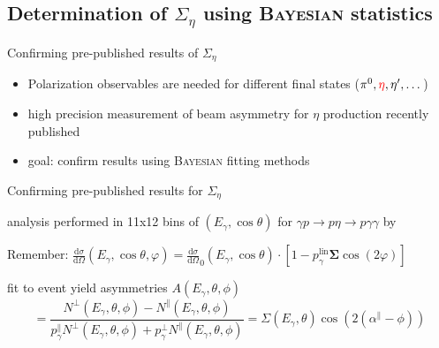 \documentclass[11pt,aspectratio=169,dvipsnames]{beamer}
\newcommand{\thecolor}{black!70!blue}
\begin{document}
	\subsection{Determination of $\Sigma_\eta$ using \textsc{Bayesian} statistics}
		\begin{frame}{Confirming pre-published results of $\Sigma_\eta$}
		\begin{itemize}
			\item Polarization observables are needed for different final states ($\pi^0,{\color{red}\eta},\eta',\dots$)
			\item high precision measurement of beam asymmetry for $\eta$ production recently published {\cites{eta}}
			\item goal: confirm results using \textsc{Bayesian} fitting methods
		\end{itemize}
		
	\end{frame}
	\begin{frame}{Confirming pre-published results for $\Sigma_\eta$}
		
		\begin{minipage}{\linewidth}
			\begin{tcolorbox}[colback=blue!5,colframe=\thecolor,title={Event selection ($\eta$)}]
				analysis performed in 11x12 bins of $(E_\gamma,\cos\theta)$ for $\gamma p\to p\eta\to p\gamma\gamma$ by {\cites{eta}}
			\end{tcolorbox}
		\end{minipage}
		\begin{minipage}{\linewidth}
			\begin{tcolorbox}[colback=blue!5,colframe=\thecolor,title={Methods}]
				\begin{center}
					Remember: $\frac{\text{d}\sigma}{\text{d}\Omega}(E_\gamma,\cos\theta,\varphi)=\frac{\text{d}\sigma}{\text{d}\Omega}_0(E_\gamma,\cos\theta)\cdot\left[1-p_\gamma^{\text{lin}}\boldsymbol{\Sigma}\cos(2\varphi)\right]$
				\end{center}
				

					\begin{tcolorbox}[colback=blue!5,colframe=\thecolor,title={Binned fit to event yield asymmetries}]
					fit to event yield asymmetries $A(E_\gamma,\theta,\phi)$\\ $$=\frac{N^\bot(E_\gamma,\theta,\phi)-N^\parallel(E_\gamma,\theta,\phi)}{p_\gamma^\parallel N^\bot(E_\gamma,\theta,\phi) + p_\gamma^\bot N^\parallel(E_\gamma,\theta,\phi)}=\Sigma(E_\gamma,\theta)\cos\left(2\left(\alpha^\parallel-\phi\right)\right)$$
							
					\end{tcolorbox}		
					
			\end{tcolorbox}
		\end{minipage}
	\end{frame}
\end{document}
